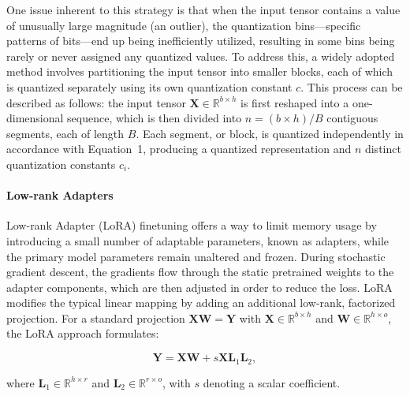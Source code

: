 One issue inherent to this strategy is that when the input tensor contains a value of unusually large magnitude (an outlier), the quantization bins—specific patterns of bits—end up being inefficiently utilized, resulting in some bins being rarely or never assigned any quantized values. To address this, a widely adopted method involves partitioning the input tensor into smaller blocks, each of which is quantized separately using its own quantization constant $c$. This process can be described as follows: the input tensor $\mathbf{X}\in \mathbb{R}^{b\times h}$ is first reshaped into a one-dimensional sequence, which is then divided into $n = ({b\times h})/{B}$ contiguous segments, each of length $B$. Each segment, or block, is quantized independently in accordance with Equation~1, producing a quantized representation and $n$ distinct quantization constants $c_i$.

\paragraph{Low-rank Adapters} Low-rank Adapter (LoRA) finetuning \citep{hu2021lora} offers a way to limit memory usage by introducing a small number of adaptable parameters, known as adapters, while the primary model parameters remain unaltered and frozen. During stochastic gradient descent, the gradients flow through the static pretrained weights to the adapter components, which are then adjusted in order to reduce the loss. LoRA modifies the typical linear mapping by adding an additional low-rank, factorized projection. For a standard projection ${\mathbf{X}\mathbf{W} = \mathbf{Y}}$ with $\mathbf{X}\in  \mathbb{R}^{b\times h}$ and $\mathbf{W}\in  \mathbb{R}^{h\times o}$, the LoRA approach formulates:

\begin{equation}
    \mathbf{Y} = \mathbf{X}\mathbf{W} + s\mathbf{X}\mathbf{L}_1\mathbf{L}_2,
\end{equation}

where $\mathbf{L}_1\in  \mathbb{R}^{h\times r}$ and $\mathbf{L}_2\in  \mathbb{R}^{r\times o}$, with $s$ denoting a scalar coefficient.

